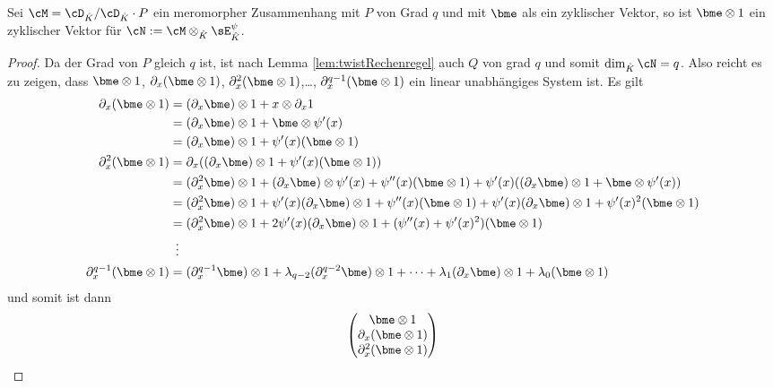 \begin{comment}
\cite[Chap 5 §2]{coutinho1995primer}
\end{comment}
\begin{lem}
Sei $\cM=\cD_{\hat K}/\cD_{\hat K}\cdot P$ ein meromorpher Zusammenhang mit $P$
von Grad $q$ und mit $\bme$ als ein zyklischer Vektor, so ist $\bme\otimes1$
ein zyklischer Vektor für $\cN:=\cM\otimes_{\hat K}\sE_{\hat K}^\psi$.
\end{lem}
\begin{proof}
Da der Grad von $P$ gleich $q$ ist, ist nach Lemma \ref{lem:twistRechenregel}
auch $Q$ von grad $q$ und somit $\dim_{\hat K}\cN= q$.
Also reicht es zu zeigen, dass $\bme\otimes 1$, $\partial_x(\bme\otimes 1)$,
$\partial_x^2(\bme\otimes 1)$,\dots, $\partial_x^{q-1}(\bme\otimes 1)$ ein
linear unabhängiges System ist.  Es gilt
\begin{align*}
\partial_x(\bme\otimes 1) &= (\partial_x \bme)\otimes 1 + x\otimes \partial_x 1\\
  &= (\partial_x \bme)\otimes 1 + \bme\otimes \psi'(x)\\
  &= (\partial_x \bme)\otimes 1 +  \psi'(x)(\bme\otimes 1)\\
\partial_x^2(\bme\otimes 1) &= \partial_x((\partial_x \bme)\otimes 1 +
    \psi'(x)(\bme\otimes 1))\\
  &= (\partial_x^2 \bme)\otimes 1 + (\partial_x \bme)\otimes \psi'(x)
  + \psi''(x)(\bme\otimes 1)
  + \psi'(x)((\partial_x \bme)\otimes 1 + \bme\otimes \psi'(x))\\
  &= (\partial_x^2 \bme)\otimes 1
  + \psi'(x)(\partial_x \bme)\otimes 1
  + \psi''(x)(\bme\otimes 1)
  + \psi'(x)(\partial_x \bme)\otimes 1
  + \psi'(x)^2(\bme\otimes 1)\\
  &= (\partial_x^2 \bme)\otimes 1
  + 2\psi'(x)(\partial_x \bme)\otimes 1
  + (\psi''(x) + \psi'(x)^2)(\bme\otimes 1)\\
  &\,\,\,\vdots\\
\partial_x^{q-1}(\bme\otimes 1) &= (\partial_x^{q-1} \bme)\otimes 1
  + \lambda_{q-2}(\partial_x^{q-2} \bme)\otimes 1
  +\dots
  + \lambda_{1}(\partial_x \bme)\otimes 1
  + \lambda_0(\bme\otimes 1)\\
\end{align*}
und somit ist dann
\[
\begin{pmatrix}
\bme\otimes 1\\
\partial_x(\bme\otimes 1)\\
\partial_x^2(\bme\otimes 1)\\

\end{pmatrix}\]
\end{proof}
